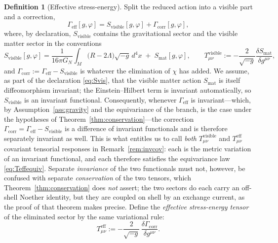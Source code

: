 \documentclass[11pt,reqno]{amsart}
\numberwithin{equation}{section}
\theoremstyle{plain}
\theoremstyle{definition}
\newtheorem{definition}[theorem]{Definition}
\theoremstyle{remark}
\newcommand{\Geff}{\Gamma_{\mathrm{eff}}}
\newcommand{\Gcorr}{\Gamma_{\mathrm{corr}}}
\newcommand{\Svis}{S_{\mathrm{visible}}}
\begin{document}
\begin{definition}[Effective stress-energy]
\label{def:Teff}
Split the reduced action into a visible part and a correction,
\begin{equation}
\label{eq:split}
\Geff[g,\varphi]=\Svis[g,\varphi]+\Gcorr[g,\varphi],
\end{equation}
where, by declaration, $\Svis$ contains the gravitational sector and the visible matter
sector in the conventions
\begin{equation}
\label{eq:Svis}
\Svis[g,\varphi]
=\frac{1}{16\pi G_{N}}\int_{M}\!\bigl(R-2\Lambda\bigr)\sqrt{-g}\,d^{4}x
\;+\;S_{\mathrm{mat}}[g,\varphi],
\qquad
T^{\mathrm{visible}}_{\mu\nu}
:=-\frac{2}{\sqrt{-g}}\frac{\delta S_{\mathrm{mat}}}{\delta g^{\mu\nu}},
\end{equation}
and $\Gcorr:=\Geff-\Svis$ is whatever the elimination of $\chi$ has added. We assume, as part
of the declaration \eqref{eq:Svis}, that the visible matter action $S_{\mathrm{mat}}$ is itself
diffeomorphism invariant; the Einstein--Hilbert term is invariant automatically, so $\Svis$ is
an invariant functional. Consequently, whenever $\Geff$ is invariant---which, by
Assumption~\ref{ass:gravity} and the equivariance of the branch, is the case under the
hypotheses of Theorem~\ref{thm:conservation}---the correction
$\Gcorr=\Geff-\Svis$ is a difference of invariant functionals and is therefore separately
invariant as well. This is what entitles us to call \emph{both} $T^{\mathrm{visible}}_{\mu\nu}$
and $T^{\mathrm{eff}}_{\mu\nu}$ covariant tensorial responses in Remark~\ref{rem:invcov}: each
is the metric variation of an invariant functional, and each therefore satisfies the
equivariance law \eqref{eq:Teffequiv}. Separate \emph{invariance} of the two functionals must
not, however, be confused with separate \emph{conservation} of the two tensors, which
Theorem~\ref{thm:conservation} does \emph{not} assert; the two sectors do each carry an
off-shell Noether identity, but they are coupled on shell by an exchange current, as the proof
of that theorem makes precise. Define the \emph{effective stress-energy tensor} of the
eliminated sector by the same variational rule:
\begin{equation}
\label{eq:Teff}
\boxed{\ \
T^{\mathrm{eff}}_{\mu\nu}
:=-\frac{2}{\sqrt{-g}}\,\frac{\delta\Gcorr}{\delta g^{\mu\nu}} .
\ \ }
\end{equation}
\end{definition}
\end{document}
